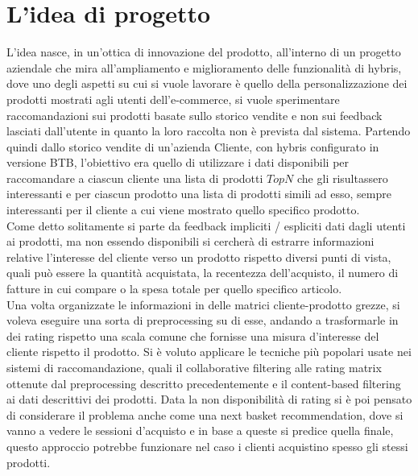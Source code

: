 \section{L'idea di progetto}
L'idea nasce, in un'ottica di innovazione del prodotto, all'interno di un progetto aziendale che mira all'ampliamento e miglioramento delle funzionalità di hybris, dove uno degli aspetti su cui si vuole lavorare è quello della personalizzazione dei prodotti mostrati agli utenti dell'e-commerce, si vuole sperimentare raccomandazioni sui prodotti basate sullo storico vendite e non sui feedback lasciati dall'utente in quanto la loro raccolta non è prevista dal sistema.
Partendo quindi dallo storico vendite di un'azienda Cliente, con hybris configurato in versione BTB, l'obiettivo era quello di utilizzare i dati disponibili per raccomandare a ciascun cliente una lista di prodotti $TopN$ che gli risultassero interessanti e per ciascun prodotto una lista di prodotti simili ad esso, sempre interessanti per il cliente a cui viene mostrato quello specifico prodotto.\\
Come detto solitamente si parte da feedback impliciti / espliciti dati dagli utenti ai prodotti, ma non essendo disponibili si cercherà di estrarre informazioni relative l'interesse del cliente verso un prodotto rispetto diversi punti di vista, quali può essere la quantità acquistata, la recentezza dell'acquisto, il numero di fatture in cui compare o la spesa totale per quello specifico articolo.\\
Una volta organizzate le informazioni in delle matrici cliente-prodotto grezze, si voleva eseguire una sorta di preprocessing su di esse, andando a trasformarle in dei rating rispetto una scala comune che fornisse una misura d'interesse del cliente rispetto il prodotto. Si è voluto applicare le tecniche più popolari usate nei sistemi di raccomandazione, quali il collaborative filtering alle rating matrix ottenute dal preprocessing descritto precedentemente e il content-based filtering ai dati descrittivi dei prodotti.
Data la non disponibilità di rating si è poi pensato di considerare il problema anche come una next basket recommendation, dove si vanno a vedere le sessioni d'acquisto e in base a queste si predice quella finale, questo approccio potrebbe funzionare nel caso i clienti acquistino spesso gli stessi prodotti.

